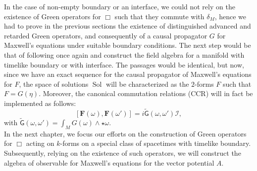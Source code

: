 In the case of non-empty boundary or an interface, we could not rely on the existence of Green operators for $\Box$ such that they commute with $\delta_M$, hence we had to prove in the previous sections the existence of distinguished advanced and retarded Green operators, and consequently of a causal propagator $G$ for Maxwell's equations under suitable boundary conditions. The next step would be that of following
\cite{dappiaggi2012quantization} once again and construct the field algebra for a manifold with timelike boundary or with interface. The passages would be identical, but now, since we have an exact sequence for the causal propagator of Maxwell's equations for $F$, the space of solutions $\operatorname{Sol}$ will be characterized as the $2$-forms $F$ such that $F=G(\eta)$. Moreover, the canonical commutation relations (CCR) will in fact be implemented as follows:
\[	\left[	\mathbf{F}(\omega),\mathbf{F}(\omega')	\right]=i\widetilde{\mathsf{G}}(\omega,\omega')	\mathcal{I},	\]
with $\widetilde{\mathsf{G}}(\omega,\omega')=\int_M G(\omega)\wedge\star\omega$.\\

In the next chapter, we focus our efforts on the construction of Green operators for $\Box$ acting on $k$-forms on a special class of spacetimes with timelike boundary. Subsequently, relying on the existence of such operators, we will construct the algebra of observable for Maxwell's equations for the vector potential $A$.




